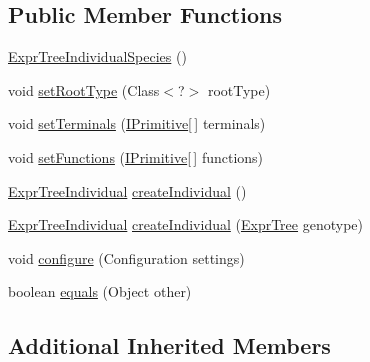 \subsection*{Public Member Functions}
\begin{DoxyCompactItemize}
\item 
\hyperlink{classnet_1_1sf_1_1jclec_1_1exprtree_1_1_expr_tree_individual_species_a84656e077221abff562f864629d0144a}{Expr\-Tree\-Individual\-Species} ()
\item 
void \hyperlink{classnet_1_1sf_1_1jclec_1_1exprtree_1_1_expr_tree_individual_species_a9e294e2d9ff9b46e8a6e296714a9099a}{set\-Root\-Type} (Class$<$?$>$ root\-Type)
\item 
void \hyperlink{classnet_1_1sf_1_1jclec_1_1exprtree_1_1_expr_tree_individual_species_a8215ed33917e3083423cb5b6705a0ccd}{set\-Terminals} (\hyperlink{interfacenet_1_1sf_1_1jclec_1_1exprtree_1_1_i_primitive}{I\-Primitive}\mbox{[}$\,$\mbox{]} terminals)
\item 
void \hyperlink{classnet_1_1sf_1_1jclec_1_1exprtree_1_1_expr_tree_individual_species_ae6e240a2c491c3fcd904ce51ae3711c3}{set\-Functions} (\hyperlink{interfacenet_1_1sf_1_1jclec_1_1exprtree_1_1_i_primitive}{I\-Primitive}\mbox{[}$\,$\mbox{]} functions)
\item 
\hyperlink{classnet_1_1sf_1_1jclec_1_1exprtree_1_1_expr_tree_individual}{Expr\-Tree\-Individual} \hyperlink{classnet_1_1sf_1_1jclec_1_1exprtree_1_1_expr_tree_individual_species_a6936c4b65390bca20a51bf0bccc43680}{create\-Individual} ()
\item 
\hyperlink{classnet_1_1sf_1_1jclec_1_1exprtree_1_1_expr_tree_individual}{Expr\-Tree\-Individual} \hyperlink{classnet_1_1sf_1_1jclec_1_1exprtree_1_1_expr_tree_individual_species_a1fb358ef3ae35458367cc916fa194884}{create\-Individual} (\hyperlink{classnet_1_1sf_1_1jclec_1_1exprtree_1_1_expr_tree}{Expr\-Tree} genotype)
\item 
void \hyperlink{classnet_1_1sf_1_1jclec_1_1exprtree_1_1_expr_tree_individual_species_a7f28787d5d80d52e655d2ebf889f0ae0}{configure} (Configuration settings)
\item 
boolean \hyperlink{classnet_1_1sf_1_1jclec_1_1exprtree_1_1_expr_tree_individual_species_a2eea8118c76cc7f4f3249fde0b8afb64}{equals} (Object other)
\end{DoxyCompactItemize}
\subsection*{Additional Inherited Members}



